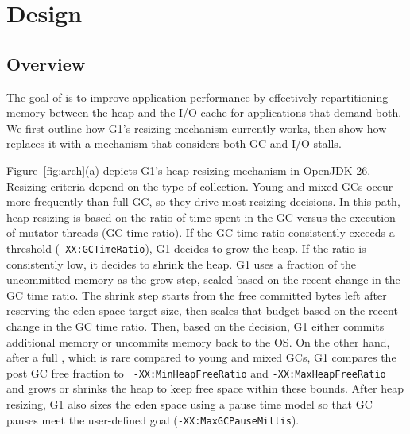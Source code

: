 \section{\flexheapName{} Design}

\subsection{Overview}

The goal of \flexheapName{} is to improve application performance by effectively repartitioning memory between the heap and the I/O cache for applications that demand both.
We first outline how G1’s resizing mechanism currently works, then show how \flexheapName{} replaces it with a mechanism that considers both GC and I/O stalls.


Figure~\ref{fig:arch}(a) depicts G1’s heap resizing mechanism in OpenJDK 26.
Resizing criteria depend on the type of collection.
Young and mixed GCs occur more frequently than full GC, so they drive most resizing decisions.
In this path, heap resizing is based on the ratio of time spent in the GC versus the execution of mutator threads (GC time ratio).
If the GC time ratio consistently exceeds a threshold (\texttt{-XX:GCTimeRatio}), G1 decides to grow the heap.
If the ratio is consistently low, it decides to shrink the heap.
G1 uses a fraction of the uncommitted memory as the grow step, scaled based on the recent change in the GC time ratio.
The shrink step starts from the free committed bytes left after reserving the eden space target size, then scales that budget based on the recent change in the GC time ratio.
Then, based on the decision, G1 either commits additional memory or uncommits memory back to the OS.
On the other hand, after a full \flexheapGC{}, which is rare compared to young and mixed GCs, G1 compares the post GC free fraction to \texttt{ -XX:MinHeapFreeRatio} and \texttt{-XX:MaxHeapFreeRatio} and grows or shrinks the heap to keep free space within these bounds.
After heap resizing, G1 also sizes the eden space using a pause time model so that GC pauses meet the user-defined goal (\texttt{-XX:MaxGCPauseMillis}).

